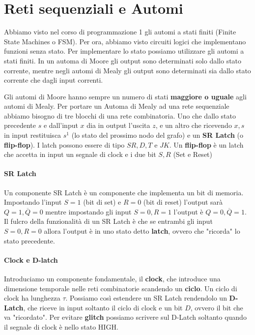\section{Reti sequenziali e Automi}

Abbiamo visto nel corso di programmazione 1 gli automi a stati finiti (Finite State Machines o FSM). Per ora, abbiamo visto circuiti logici che implementano funzioni senza stato. Per implementare lo stato possiamo utilizzare gli automi a stati finiti. In un automa di Moore gli output sono determinati solo dallo stato corrente, mentre negli automi di Mealy gli output sono determinati sia dallo stato corrente che dagli input correnti.


Gli automi di Moore hanno sempre un numero di stati \textbf{maggiore o uguale} agli automi di Mealy. Per portare un Automa di Mealy ad una rete sequenziale abbiamo bisogno di tre blocchi di una rete combinatoria. Uno che dallo stato precedente $ s $ e dall'input $ x $ dia in output l'uscita $ z $, e un altro che ricevendo $ x,s $ in input restituisca $ s^1 $ (lo stato del prossimo nodo del grafo) e un \textbf{SR Latch} (o \textbf{flip-flop}). I latch possono essere di tipo $ SR, D, T $ e $ JK $. Un \textbf{flip-flop} è un latch che accetta in input un segnale di clock e i due bit $ S,R $ (Set e Reset)
 

\paragraph{SR Latch}

Un componente SR Latch è un componente che implementa un bit di memoria. Impostando l'input $ S=1 $ (bit di set) e $ R=0 $  (bit di reset) l'output sarà $ Q=1,\overbar{Q}=0 $ mentre impostando gli input $ S=0,R=1 $ l'output è $ Q=0,\overbar{Q}=1 $. Il fulcro della funzionalità di un SR Latch è che se entrambi gli input $ S=0,R=0 $ allora l'output è in uno stato detto \textbf{latch}, ovvero che "ricorda" lo stato precedente.


\paragraph{Clock e D-latch}

Introduciamo un componente fondamentale, il \textbf{clock}, che introduce una dimensione temporale nelle reti combinatorie scandendo un \textbf{ciclo}. Un ciclo di clock ha lunghezza $ \tau $. Possiamo così estendere un SR Latch rendendolo un \textbf{D-Latch}, che riceve in input soltanto il ciclo di clock e un bit $ D $, ovvero il bit che va "ricordato". Per evitare \textbf{glitch} possiamo scrivere sul D-Latch soltanto quando il segnale di clock è nello stato HIGH.

